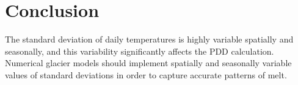 \documentclass[twocolumn]{igs}
\begin{document}
\section{Conclusion}

The standard deviation of daily temperatures is highly variable spatially and seasonally, and this variability significantly affects the PDD calculation. Numerical glacier models should implement spatially and seasonally variable values of standard deviations in order to capture accurate patterns of melt.



\end{document}
